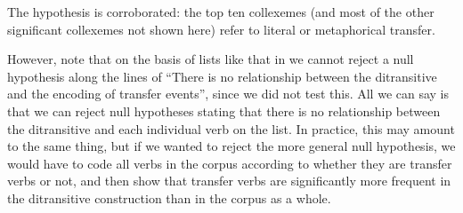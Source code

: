 \begin{table}
\caption{The verbs in the ditransitive construction (ICE\hyp{}GB, \citet[229]{stefanowitsch_collostructions:_2003})}
\label{tab:verbsditransitive}
\end{table}

The hypothesis is corroborated: the top ten collexemes  (and most of the other significant collexemes not shown here) refer to literal  or metaphorical transfer.

However, note that on the basis of lists like that in  we cannot reject a null hypothesis along the lines of ``There is no relationship between the ditransitive  and the encoding of transfer events'', since we did not test this. All we can say is that we can reject null hypotheses stating that there is no relationship between the ditransitive and each individual verb  on the list. In practice, this may amount to the same thing, but if we wanted to reject the more general null hypothesis, we would have to code  all verbs  in the corpus according to whether they are transfer verbs or not, and then show that transfer verbs are significantly more frequent in the ditransitive  construction than in the corpus as a whole.

